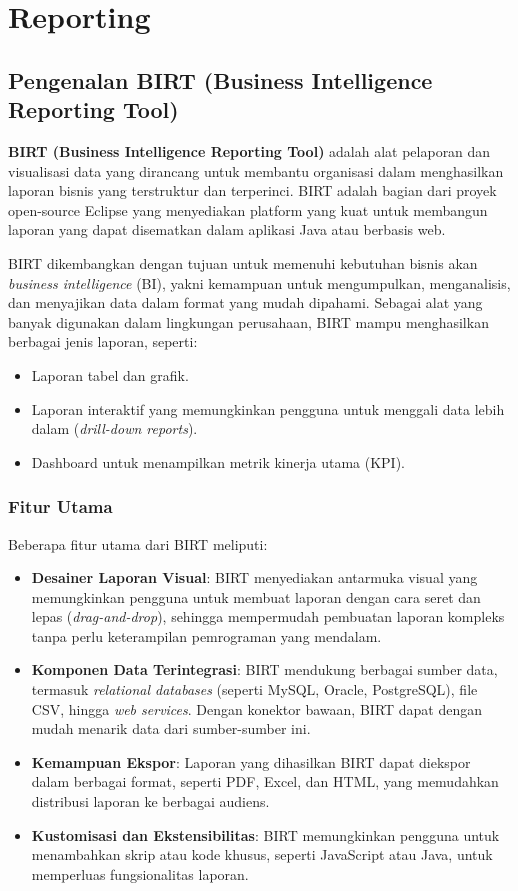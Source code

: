 \chapter{Reporting}

\section{Pengenalan BIRT (Business Intelligence Reporting Tool)}

\textbf{BIRT (Business Intelligence Reporting Tool)} adalah alat pelaporan dan visualisasi data yang dirancang untuk membantu organisasi dalam menghasilkan laporan bisnis yang terstruktur dan terperinci. BIRT adalah bagian dari proyek open-source Eclipse yang menyediakan platform yang kuat untuk membangun laporan yang dapat disematkan dalam aplikasi Java atau berbasis web.

BIRT dikembangkan dengan tujuan untuk memenuhi kebutuhan bisnis akan \textit{business intelligence} (BI), yakni kemampuan untuk mengumpulkan, menganalisis, dan menyajikan data dalam format yang mudah dipahami. Sebagai alat yang banyak digunakan dalam lingkungan perusahaan, BIRT mampu menghasilkan berbagai jenis laporan, seperti:

\begin{itemize}
	\item Laporan tabel dan grafik.
	\item Laporan interaktif yang memungkinkan pengguna untuk menggali data lebih dalam (\textit{drill-down reports}).
	\item Dashboard untuk menampilkan metrik kinerja utama (KPI).
\end{itemize}

\subsection{Fitur Utama}

Beberapa fitur utama dari BIRT meliputi:

\begin{itemize}
	\item \textbf{Desainer Laporan Visual}: BIRT menyediakan antarmuka visual yang memungkinkan pengguna untuk membuat laporan dengan cara seret dan lepas (\textit{drag-and-drop}), sehingga mempermudah pembuatan laporan kompleks tanpa perlu keterampilan pemrograman yang mendalam.
	\item \textbf{Komponen Data Terintegrasi}: BIRT mendukung berbagai sumber data, termasuk \textit{relational databases} (seperti MySQL, Oracle, PostgreSQL), file CSV, hingga \textit{web services}. Dengan konektor bawaan, BIRT dapat dengan mudah menarik data dari sumber-sumber ini.
	\item \textbf{Kemampuan Ekspor}: Laporan yang dihasilkan BIRT dapat diekspor dalam berbagai format, seperti PDF, Excel, dan HTML, yang memudahkan distribusi laporan ke berbagai audiens.
	\item \textbf{Kustomisasi dan Ekstensibilitas}: BIRT memungkinkan pengguna untuk menambahkan skrip atau kode khusus, seperti JavaScript atau Java, untuk memperluas fungsionalitas laporan.
\end{itemize}

